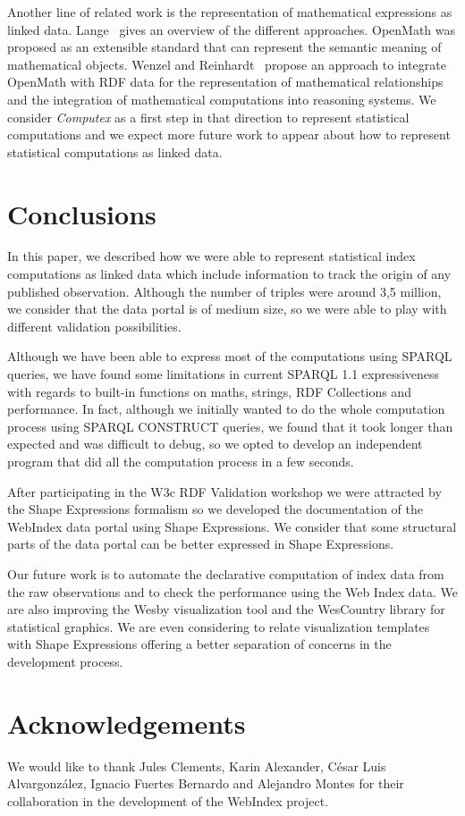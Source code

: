\documentclass{llncs}
\newcommand{\TODO}[1]{{\color{red}{\textbf{TODO: {#1}}\xspace}}}
\begin{document}
Another line of related work is the representation of mathematical expressions as linked data. 
Lange~\cite{Lange13} gives an overview of the different approaches. 
OpenMath was proposed as an extensible standard that can represent the semantic meaning of mathematical objects. 
Wenzel and Reinhardt~\cite{Wenzel12} 
propose an approach to integrate OpenMath with
RDF data for the representation of mathematical relationships and the integration
of mathematical computations into reasoning systems.
We consider \emph{Computex} as a first step in that 
direction to represent statistical computations and 
we expect more future work to appear about how to
represent statistical computations as linked data.

\section{Conclusions}

In this paper, we described how we were able to represent statistical index computations as linked data which include information to track the origin of any published observation. 
Although the number of triples were around 3,5 million, we consider that the data portal is of medium size, so we were able to play with different validation possibilities.

Although we have been able to express most of the computations using SPARQL queries, we have found some
limitations in current SPARQL 1.1 expressiveness with regards to built-in
functions on maths, strings, RDF Collections and performance. In fact, although we initially wanted to do the whole computation process using SPARQL CONSTRUCT queries, we found that it took longer than expected and was difficult to debug, so we opted to develop an independent program that did all the computation process in a few seconds.

After participating in the W3c RDF Validation workshop we were attracted by the Shape Expressions formalism so we developed the documentation of the WebIndex data portal using Shape Expressions. We consider that some structural parts of the data portal can be better expressed in Shape Expressions.

Our future work is to automate the declarative computation of index data
 from the raw observations and to check the performance using
 the Web Index data. We are also improving the Wesby visualization tool and the WesCountry library for statistical graphics. We are even considering to relate visualization templates with Shape Expressions offering a better separation of concerns in the development process.


\section{Acknowledgements}

We would like to thank Jules Clements, Karin Alexander, César Luis Alvargonzález, Ignacio Fuertes Bernardo and Alejandro Montes for their collaboration in the development of the WebIndex project.



\end{document}
